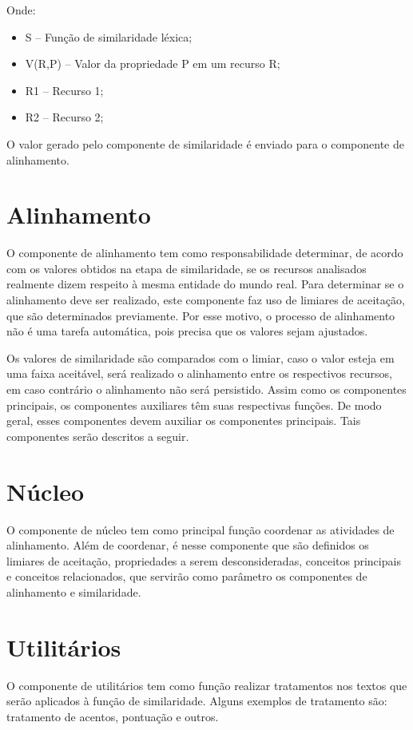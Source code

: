 Onde:

\begin{itemize}
	\item S – Função de similaridade léxica;
	\item V(R,P) – Valor da propriedade P em um recurso R;
	\item R1 – Recurso 1;
	\item R2 – Recurso 2;
\end{itemize}

O valor gerado pelo componente de similaridade é enviado para o componente de alinhamento.


\section*{Alinhamento}
O componente de alinhamento tem como responsabilidade determinar, de acordo com os valores obtidos na etapa de similaridade, se os recursos analisados realmente dizem respeito à mesma entidade do mundo real. Para determinar se o alinhamento deve ser realizado, este componente faz uso de limiares de aceitação, que são determinados previamente. Por esse motivo, o processo de alinhamento não é uma tarefa automática, pois precisa que os valores sejam ajustados.

Os valores de similaridade são comparados com o limiar, caso o valor esteja em uma faixa aceitável, será realizado o alinhamento entre os respectivos recursos, em caso contrário o alinhamento não será persistido. Assim como os componentes principais, os componentes auxiliares têm suas respectivas funções. De modo geral, esses componentes devem auxiliar os componentes principais. Tais componentes serão descritos a seguir.


\section*{Núcleo}
O componente de núcleo tem como principal função coordenar as atividades de alinhamento. Além de coordenar, é nesse componente que são definidos os limiares de aceitação, propriedades a serem desconsideradas, conceitos principais e conceitos relacionados, que servirão como parâmetro os componentes de alinhamento e similaridade.


\section*{Utilitários}
O componente de utilitários tem como função realizar tratamentos nos textos que serão aplicados à função de similaridade. Alguns exemplos de tratamento são: tratamento de acentos, pontuação e outros.